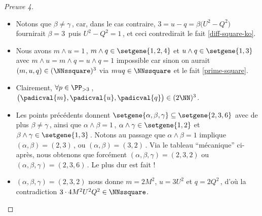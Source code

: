 \begin{proof}[Preuve 4]
\begin{itemize}
		\item Notons que $\beta \neq \gamma$\,, car, dans le cas contraire, $3 = u - q = \beta \big( U^2 - Q^2 \big)$ fournirait $\beta = 3$\, puis $U^2 - Q^2 = 1$\,, et ceci contredirait le fait \ref{diff-square-ko}.


		\item Nous avons $m \wedge u = 1$\,, $m \wedge q \in \setgene{1, 2, 4}$ et $u \wedge q \in \setgene{1, 3}$
		avec $m \wedge u = m \wedge q = u \wedge q = 1$ impossible car sinon on aurait $(m, u, q) \in ( \NNssquare )^3$ via $muq \in \NNssquare$ et le fait \ref{prime-square}.


		\item Clairement, $\forall p \in \PP_{>3}$\,, $\big( \padicval{m} , \padicval{u} , \padicval{q} \big) \in ( 2 \NN )^3$.


		\item Les points précédents donnent 
		$\setgene{\alpha, \beta, \gamma} \subseteq \setgene{2, 3, 6}$
		avec de plus
		$\beta \neq \gamma$\,,
		ainsi que 
		$\alpha \wedge \beta = 1$\,, $\alpha \wedge \gamma \in \setgene{1, 2}$ et $\beta \wedge \gamma \in \setgene{1, 3}$\,.
		Notons au passage que $\alpha \wedge \beta = 1$ implique $(\alpha, \beta) = (2, 3)$\,, ou $(\alpha, \beta) = (3, 2)$\,.
		Via le tableau \enquote{mécanique} ci-après, nous obtenons que forcément $(\alpha, \beta, \gamma) = (2, 3, 2)$ ou $(\alpha, \beta, \gamma) = (2, 3, 6)$\,. Le plus dur est fait !
	\end{itemize}

	\begin{center}
	\end{center}


	\begin{itemize}
		\item $(\alpha, \beta, \gamma) = (2, 3, 2)$ nous donne $m = 2 M^2$, $u = 3 U^2$ et $q = 2 Q^2$\,, d'où la contradiction $3 \cdot4 M^2 U^2 Q^2 \in \NNssquare$.



\end{itemize}
\end{proof}

